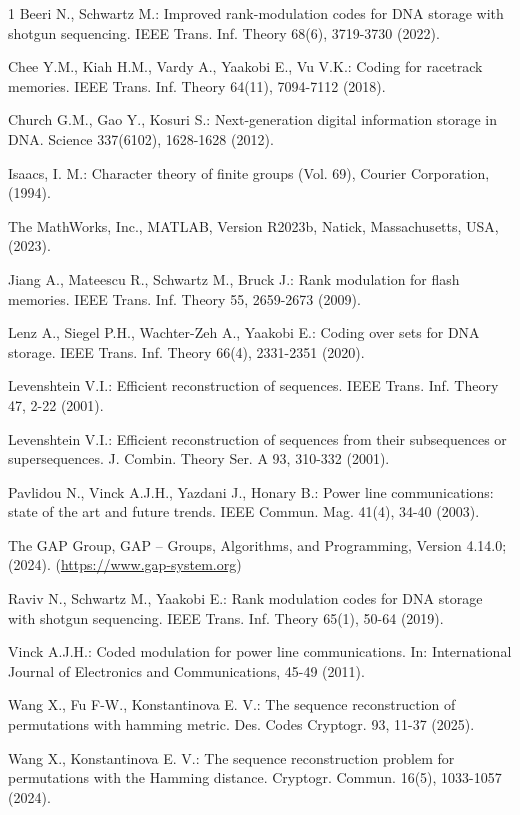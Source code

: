 \documentclass{amsart}
\numberwithin{equation}{section}
\begin{document}
\begin{thebibliography}{1}
\bibitem{[1]} Beeri N., Schwartz M.: Improved rank-modulation codes for DNA storage with shotgun sequencing. IEEE Trans. Inf. Theory 68(6), 3719-3730 (2022).

\bibitem{[2]} Chee Y.M., Kiah H.M., Vardy A., Yaakobi E., Vu V.K.: Coding for racetrack memories. IEEE Trans. Inf. Theory 64(11), 7094-7112 (2018).

\bibitem{[3]} Church G.M., Gao Y., Kosuri S.: Next-generation digital information storage in DNA. Science 337(6102), 1628-1628 (2012).

Isaacs, I. M.:  Character theory of finite groups (Vol. 69),  Courier Corporation, (1994).

The MathWorks, Inc., MATLAB, Version R2023b, Natick, Massachusetts, USA, (2023). 

\bibitem{[8]} Jiang A., Mateescu R., Schwartz M., Bruck J.: Rank modulation for flash memories. IEEE Trans. Inf. Theory 55, 2659-2673 (2009).

\bibitem{[13]} Lenz A., Siegel P.H., Wachter-Zeh A., Yaakobi E.: Coding over sets for DNA storage. IEEE Trans. Inf. Theory 66(4), 2331-2351 (2020).

\bibitem{[14]} Levenshtein V.I.: Efficient reconstruction of sequences. IEEE Trans. Inf. Theory 47, 2-22 (2001).

\bibitem{[15]} Levenshtein V.I.: Efficient reconstruction of sequences from their subsequences or supersequences. J. Combin. Theory Ser. A 93, 310-332 (2001).

\bibitem{[18]} Pavlidou N., Vinck A.J.H., Yazdani J., Honary B.: Power line communications: state of the art and future trends. IEEE Commun. Mag. 41(4), 34-40 (2003).

 The GAP Group, GAP -- Groups, Algorithms, and Programming, Version 4.14.0; (2024). (\href{https://www.gap-system.org}{https://www.gap-system.org})

\bibitem{[19]} Raviv N., Schwartz M., Yaakobi E.: Rank modulation codes for DNA storage with shotgun sequencing. IEEE Trans. Inf. Theory 65(1), 50-64 (2019).

\bibitem{[22]} Vinck A.J.H.: Coded modulation for power line communications. In: International Journal of Electronics and Communications,  45-49 (2011).

  Wang X.,  Fu F-W.,  Konstantinova E. V.: The sequence reconstruction of permutations with hamming metric. Des. Codes Cryptogr.  93,  11-37 (2025).

  Wang X.,    Konstantinova E. V.: The sequence reconstruction problem for permutations with the Hamming distance. Cryptogr. Commun. 16(5), 1033-1057 (2024).


\end{thebibliography}
\end{document}
